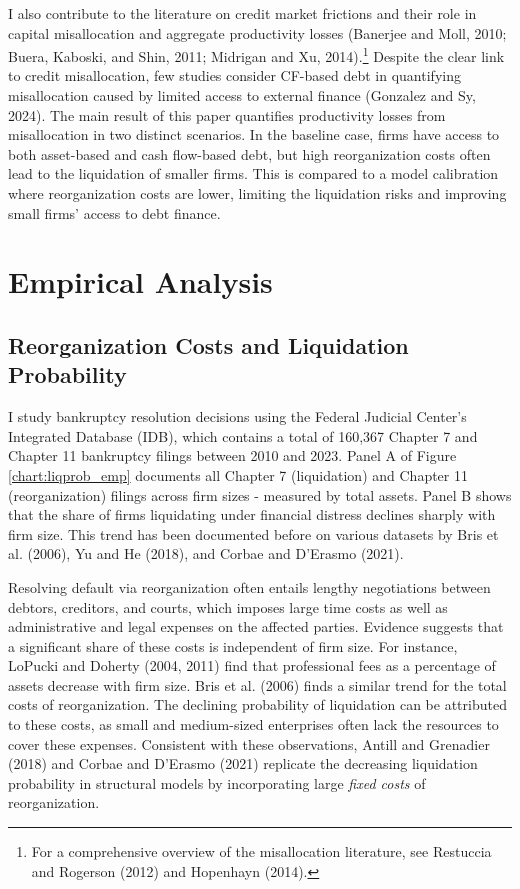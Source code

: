 \documentclass[12pt]{article}
\begin{document}
I also contribute to the literature on credit market frictions and their role in capital misallocation and aggregate productivity losses (Banerjee and Moll, 2010; Buera, Kaboski, and Shin, 2011; Midrigan and Xu, 2014).\footnote{For a comprehensive overview of the misallocation literature, see Restuccia and Rogerson (2012) and Hopenhayn (2014).} Despite the clear link to credit misallocation, few studies consider CF-based debt in quantifying misallocation caused by limited access to external finance (Gonzalez and Sy, 2024). The main result of this paper quantifies productivity losses from misallocation in two distinct scenarios. In the baseline case, firms have access to both asset-based and cash flow-based debt, but high reorganization costs often lead to the liquidation of smaller firms. This is compared to a model calibration where reorganization costs are lower, limiting the liquidation risks and improving small firms' access to debt finance. 

\section{Empirical Analysis \label{sec:empirical analysis}}

\subsection{Reorganization Costs and Liquidation Probability \label{sec:emp liqprob}} 

I study bankruptcy resolution decisions using the Federal Judicial Center's Integrated Database (IDB), which contains a total of 160,367 Chapter 7 and Chapter 11 bankruptcy filings between 2010 and 2023. Panel A of Figure \ref{chart:liqprob_emp} documents all Chapter 7 (liquidation) and Chapter 11 (reorganization) filings across firm sizes - measured by total assets. Panel B shows that the share of firms liquidating under financial distress declines sharply with firm size. This trend has been documented before on various datasets by Bris et al. (2006), Yu and He (2018), and Corbae and D'Erasmo (2021). 

Resolving default via reorganization often entails lengthy negotiations between debtors, creditors, and courts, which imposes large time costs as well as administrative and legal expenses on the affected parties. Evidence suggests that a significant share of these costs is independent of firm size. For instance, LoPucki and Doherty (2004, 2011) find that professional fees as a percentage of assets decrease with firm size. Bris et al. (2006) finds a similar trend for the total costs of reorganization. The declining probability of liquidation can be attributed to these costs, as small and medium-sized enterprises often lack the resources to cover these expenses. Consistent with these observations, Antill and Grenadier (2018) and Corbae and D'Erasmo (2021) replicate the decreasing liquidation probability in structural models by incorporating large \textit{fixed costs} of reorganization.
\end{document}
